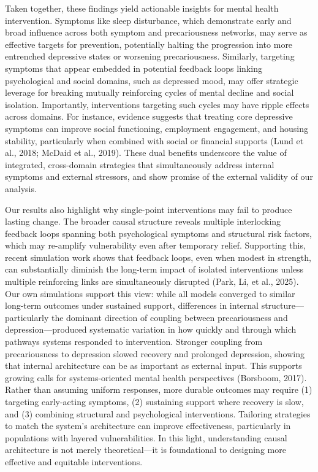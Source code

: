 \documentclass[
]{article}
\begin{document}
Taken together, these findings yield actionable insights for mental
health intervention. Symptoms like sleep disturbance, which demonstrate
early and broad influence across both symptom and precariousness
networks, may serve as effective targets for prevention, potentially
halting the progression into more entrenched depressive states or
worsening precariousness. Similarly, targeting symptoms that appear
embedded in potential feedback loops linking psychological and social
domains, such as depressed mood, may offer strategic leverage for
breaking mutually reinforcing cycles of mental decline and social
isolation. Importantly, interventions targeting such cycles may have
ripple effects across domains. For instance, evidence suggests that
treating core depressive symptoms can improve social functioning,
employment engagement, and housing stability, particularly when combined
with social or financial supports (Lund et al., 2018; McDaid et al.,
2019). These dual benefits underscore the value of integrated,
cross-domain strategies that simultaneously address internal symptoms
and external stressors, and show promise of the external validity of our
analysis.

Our results also highlight why single-point interventions may fail to
produce lasting change. The broader causal structure reveals multiple
interlocking feedback loops spanning both psychological symptoms and
structural risk factors, which may re-amplify vulnerability even after
temporary relief. Supporting this, recent simulation work shows that
feedback loops, even when modest in strength, can substantially diminish
the long-term impact of isolated interventions unless multiple
reinforcing links are simultaneously disrupted (Park, Li, et al., 2025).
Our own simulations support this view: while all models converged to
similar long-term outcomes under sustained support, differences in
internal structure---particularly the dominant direction of coupling
between precariousness and depression---produced systematic variation in
how quickly and through which pathways systems responded to
intervention. Stronger coupling from precariousness to depression slowed
recovery and prolonged depression, showing that internal architecture
can be as important as external input. This supports growing calls for
systems-oriented mental health perspectives (Borsboom, 2017). Rather
than assuming uniform responses, more durable outcomes may require (1)
targeting early-acting symptoms, (2) sustaining support where recovery
is slow, and (3) combining structural and psychological interventions.
Tailoring strategies to match the system's architecture can improve
effectiveness, particularly in populations with layered vulnerabilities.
In this light, understanding causal architecture is not merely
theoretical---it is foundational to designing more effective and
equitable interventions.
\end{document}
